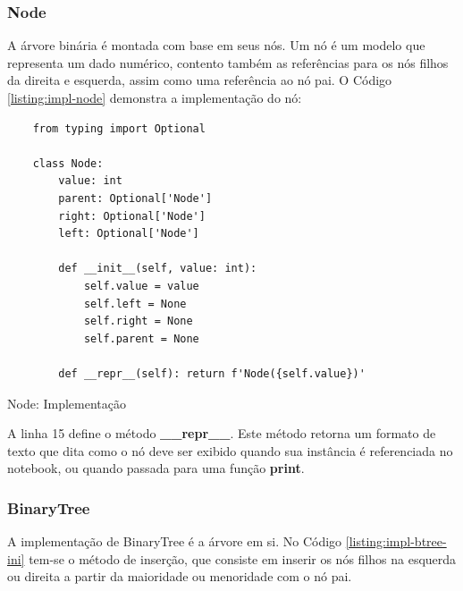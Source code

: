 \subsubsection{Node}

A árvore binária é montada com base em seus nós. Um nó é um modelo que representa um dado numérico, contento também
as referências para os nós filhos da direita e esquerda, assim como uma referência ao nó pai.\linebreak
O Código \ref{listing:impl-node} demonstra a implementação do nó:

\begin{listing}[H]
    \begin{verbatim}
    from typing import Optional

    class Node:
        value: int
        parent: Optional['Node']
        right: Optional['Node']
        left: Optional['Node']

        def __init__(self, value: int):
            self.value = value
            self.left = None
            self.right = None
            self.parent = None

        def __repr__(self): return f'Node({self.value})'
    \end{verbatim}
    \caption{Node: Implementação}
    \label{listing:impl-node}
\end{listing}

A linha 15 define o método \textbf{\_\_repr\_\_}. Este método retorna um formato de texto que dita como
o nó deve ser exibido quando sua instância é referenciada no notebook, ou quando passada para uma função \textbf{print}.

\subsubsection{BinaryTree}

A implementação de BinaryTree é a árvore em si. No Código \ref{listing:impl-btree-ini} tem-se o método de inserção,
que consiste em inserir os nós filhos na esquerda ou direita a partir da maioridade ou menoridade com o nó pai.
\vfill
\pagebreak

